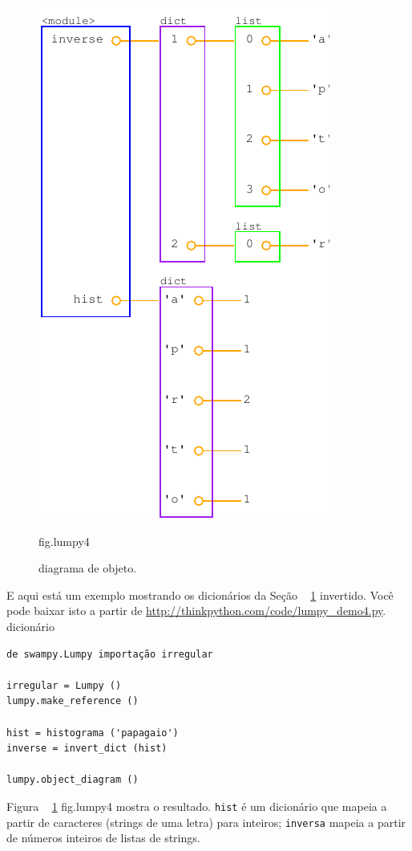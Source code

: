 \documentclass[10pt]{book}
\begin{document}
\begin{exercise}
\begin{v erbatim}
\begin{figure}
\centerline
{\includegraphics[scale = 0.7] {figs/lumpydemo4.pdf}}
\caption{diagrama de objeto.}
\label{} fig.lumpy4
\end{figure}

E aqui está um exemplo 
mostrando os dicionários da Seção ~ \ref {} invertido. Você pode baixar
isto a partir de \url{http://thinkpython.com/code/lumpy_demo4.py}.
\index{} dicionário

\begin{verbatim}
de swampy.Lumpy importação irregular

irregular = Lumpy ()
lumpy.make_reference ()

hist = histograma ('papagaio')
inverse = invert_dict (hist)

lumpy.object_diagram ()
\end{verbatim}

Figura ~ \ref {} fig.lumpy4 mostra o resultado. {\tt hist} é um dicionário
que mapeia a partir de caracteres (strings de uma letra) para inteiros;
{\tt inversa} mapeia a partir de números inteiros de listas de strings.


\end{v erbatim}
\end{exercise}
\end{document}
